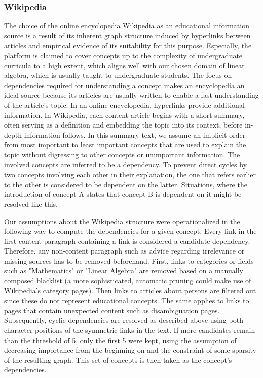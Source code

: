 \documentclass{article}
\begin{document}
\subsubsection{Wikipedia}
The choice of the online encyclopedia Wikipedia as an educational information source is a result of its inherent graph structure induced by hyperlinks between articles and empirical evidence of its suitability for this purpose. %
Especially, the platform is claimed to cover concepts up to the complexity of undergraduate curricula to a high extent, which aligns well with our chosen domain of linear algebra, which is usually taught to undergraduate students. The focus on dependencies required for understanding a concept makes an encyclopedia an ideal source because its articles are usually written to enable a fast understanding of the article's topic. In an online encyclopedia, hyperlinks provide additional information. In Wikipedia, each content article begins with a short summary, often serving as a definition and embedding the topic into its context, before in-depth information follows. In this summary text, we assume an implicit order from most important to least important concepts that are used to explain the topic without digressing to other concepts or unimportant information. The involved concepts are inferred to be a dependency. To prevent direct cycles by two concepts involving each other in their explanation, the one that refers earlier to the other is considered to be dependent on the latter. Situations, where the introduction of concept A states that concept B is dependent on it might be resolved like this.

Our assumptions about the Wikipedia structure were operationalized in the following way to compute the dependencies for a given concept. Every link in the first content paragraph containing a link is considered a candidate dependency. Therefore, any non-content paragraph such as advice regarding irrelevance or missing sources has to be removed beforehand. First, links to categories or fields such as "Mathematics" or "Linear Algebra" are removed based on a manually composed blacklist (a more sophisticated, automatic pruning could make use of Wikipedia's category pages). Then links to articles about persons are filtered out since these do not represent educational concepts. The same applies to links to pages that contain unexpected content such as disambiguation pages. Subsequently, cyclic dependencies are resolved as described above using both character positions of the symmetric links in the text. If more candidates remain than the threshold of 5, only the first 5 were kept, using the assumption of decreasing importance from the beginning on and the constraint of some sparsity of the resulting graph. This set of concepts is then taken as the concept's dependencies. 
\end{document}

